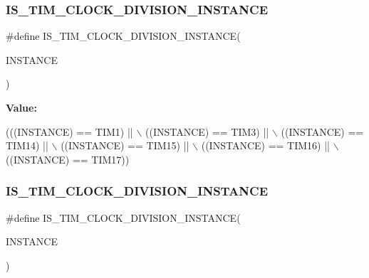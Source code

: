 \subsubsection{\texorpdfstring{I\+S\+\_\+\+T\+I\+M\+\_\+\+C\+L\+O\+C\+K\+\_\+\+D\+I\+V\+I\+S\+I\+O\+N\+\_\+\+I\+N\+S\+T\+A\+N\+CE}{IS\_TIM\_CLOCK\_DIVISION\_INSTANCE}\hspace{0.1cm}{\footnotesize\ttfamily [2/16]}}
{\footnotesize\ttfamily \#define I\+S\+\_\+\+T\+I\+M\+\_\+\+C\+L\+O\+C\+K\+\_\+\+D\+I\+V\+I\+S\+I\+O\+N\+\_\+\+I\+N\+S\+T\+A\+N\+CE(\begin{DoxyParamCaption}\item[{}]{I\+N\+S\+T\+A\+N\+CE }\end{DoxyParamCaption})}

{\bfseries Value\+:}
\begin{DoxyCode}
(((INSTANCE) == TIM1)    || \(\backslash\)
   ((INSTANCE) == TIM3)    || \(\backslash\)
   ((INSTANCE) == TIM14)   || \(\backslash\)
   ((INSTANCE) == TIM15)   || \(\backslash\)
   ((INSTANCE) == TIM16)   || \(\backslash\)
   ((INSTANCE) == TIM17))
\end{DoxyCode}
\mbox{\label{group___exported__macro_gac54b9f42e8ab07c41abe7d96d13d698a}} 
\subsubsection{\texorpdfstring{I\+S\+\_\+\+T\+I\+M\+\_\+\+C\+L\+O\+C\+K\+\_\+\+D\+I\+V\+I\+S\+I\+O\+N\+\_\+\+I\+N\+S\+T\+A\+N\+CE}{IS\_TIM\_CLOCK\_DIVISION\_INSTANCE}\hspace{0.1cm}{\footnotesize\ttfamily [3/16]}}
{\footnotesize\ttfamily \#define I\+S\+\_\+\+T\+I\+M\+\_\+\+C\+L\+O\+C\+K\+\_\+\+D\+I\+V\+I\+S\+I\+O\+N\+\_\+\+I\+N\+S\+T\+A\+N\+CE(\begin{DoxyParamCaption}\item[{}]{I\+N\+S\+T\+A\+N\+CE }\end{DoxyParamCaption})}


